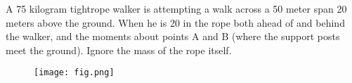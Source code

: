 
A 75 kilogram tightrope walker is attempting a walk across a 50 meter span 20 meters above the ground. When
he is 20%
in the rope both ahead of and behind the walker, and the moments about points A and B (where the support
posts meet the ground). Ignore the mass of the rope itself.


\begin{figure}[ht!]
  \centering
  \texttt{[image: fig.png]}
\end{figure}

\iftoggle{flagSoln}{%
\vspace{.5cm}
\rule{\textwidth}{.4pt}
\vspace{.5cm}
\textbf{Solution:}
\begin{figure}[ht!]
  \centering
  \texttt{[image: soln.png]}
\end{figure}
}{%
}%
